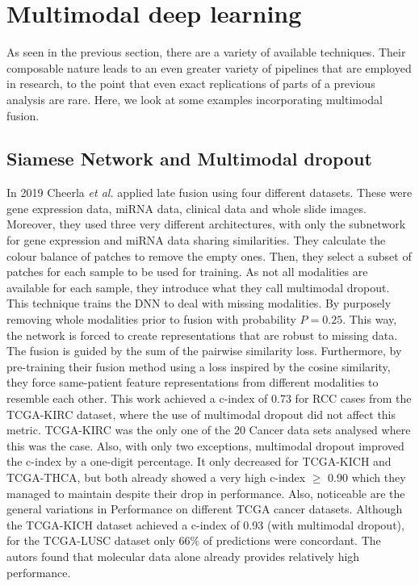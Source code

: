 \section{Multimodal deep learning}

As seen in the previous section, there are a variety of available techniques. Their composable nature leads to an even greater variety of pipelines that are employed in research, to the point that even exact replications of parts of a previous analysis are rare. Here, we look at some examples incorporating multimodal fusion.
\subsection{Siamese Network and Multimodal dropout} 
In 2019 Cheerla \textit{et al.} applied late fusion using four different datasets. These were gene expression data, miRNA data, clinical data and whole slide images. Moreover, they used three very different architectures, with only the subnetwork for gene expression and miRNA data sharing similarities. They calculate the colour balance of patches to remove the empty ones. Then, they select a subset of patches for each sample to be used for training. As not all modalities are available for each sample, they introduce what they call multimodal dropout. This technique trains the DNN to deal with missing modalities. By purposely removing whole modalities prior to fusion with probability $P=0.25$. This way, the network is forced to create representations that are robust to missing data. The fusion is guided by the sum of the pairwise similarity loss. Furthermore, by pre-training their fusion method using a loss inspired by the cosine similarity, they force same-patient feature representations from different modalities to resemble each other.
This work achieved a c-index of 0.73 for RCC cases from the TCGA-KIRC dataset, where the use of multimodal dropout did not affect this metric. TCGA-KIRC was the only one of the 20 Cancer data sets analysed where this was the case. Also, with only two exceptions, multimodal dropout improved the c-index by a one-digit percentage. It only decreased for TCGA-KICH and TCGA-THCA, but both already showed a very high c-index $\ge$ 0.90 which they managed to maintain despite their drop in performance.
Also, noticeable are the general variations in Performance on different TCGA cancer datasets. Although the TCGA-KICH dataset achieved a c-index of 0.93 (with multimodal dropout), for the TCGA-LUSC dataset only 66\% of predictions were concordant. The autors  found that molecular data alone already provides relatively high performance. \cite{Cheerla2019Deep}
